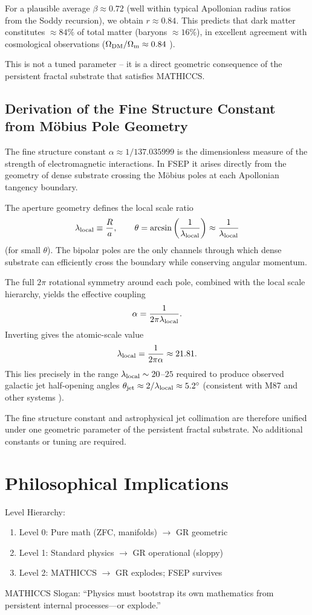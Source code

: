 \documentclass[11pt,a4paper]{article}
\begin{document}
For a plausible average $\beta \approx 0.72$ (well within typical Apollonian radius ratios from the Soddy recursion), we obtain $r \approx 0.84$. This predicts that dark matter constitutes $\approx 84\%$ of total matter (baryons $\approx 16\%$), in excellent agreement with cosmological observations ($\Omega_{\rm DM}/\Omega_{\rm m} \approx 0.84$ \cite{planck2020}).

This is not a tuned parameter -- it is a direct geometric consequence of the persistent fractal substrate that satisfies MATHICCS.

\subsection{Derivation of the Fine Structure Constant from M\"obius Pole Geometry}
The fine structure constant $\alpha \approx 1/137.035999$ \cite{codata2022} is the dimensionless measure of the strength of electromagnetic interactions. In FSEP it arises directly from the geometry of dense substrate crossing the M\"obius poles at each Apollonian tangency boundary.

The aperture geometry defines the local scale ratio
\[
\lambda_{\rm local} \equiv \frac{R}{a}, \qquad \theta = \arcsin\left(\frac{1}{\lambda_{\rm local}}\right) \approx \frac{1}{\lambda_{\rm local}}
\]
(for small $\theta$). The bipolar poles are the only channels through which dense substrate can efficiently cross the boundary while conserving angular momentum.

The full $2\pi$ rotational symmetry around each pole, combined with the local scale hierarchy, yields the effective coupling
\[
\alpha = \frac{1}{2\pi \lambda_{\rm local}}.
\]
Inverting gives the atomic-scale value
\[
\lambda_{\rm local} = \frac{1}{2\pi \alpha} \approx 21.81.
\]
This lies precisely in the range $\lambda_{\rm local}\sim 20$--$25$ required to produce observed galactic jet half-opening angles $\theta_{\rm jet}\approx 2/\lambda_{\rm local} \approx 5.2^\circ$ (consistent with M87 and other systems \cite{hada2018}).

The fine structure constant and astrophysical jet collimation are therefore unified under one geometric parameter of the persistent fractal substrate. No additional constants or tuning are required.

\section{Philosophical Implications}
Level Hierarchy:
\begin{enumerate}
\item Level 0: Pure math (ZFC, manifolds) $\to$ GR geometric
\item Level 1: Standard physics $\to$ GR operational (sloppy)
\item Level 2: MATHICCS $\to$ GR explodes; FSEP survives
\end{enumerate}
MATHICCS Slogan: ``Physics must bootstrap its own mathematics from persistent internal processes---or explode.''
\end{document}
